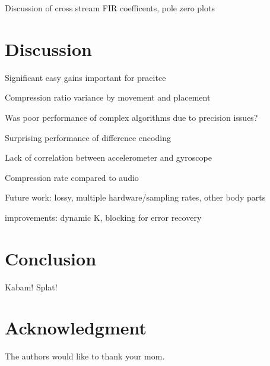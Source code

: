 \documentclass[journal]{IEEEtran}
\begin{document}
Discussion of cross stream FIR coefficents, pole zero plots
\section{Discussion}
Significant easy gains important for pracitce

Compression ratio variance by movement and placement

Was poor performance of complex algorithms due to precision issues?

Surprising performance of difference encoding

Lack of correlation between accelerometer and gyroscope

Compression rate compared to audio

Future work: lossy, multiple hardware/sampling rates, other body parts

improvements: dynamic K, blocking for error recovery

\section{Conclusion}
Kabam! Splat!


\section*{Acknowledgment}

The authors would like to thank your mom.

\end{document}

